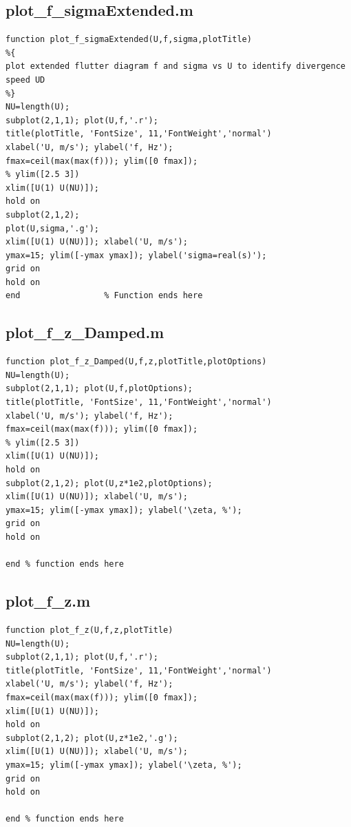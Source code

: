 \documentclass{article}
\begin{document}
\newpage
\subsection{plot\_f\_sigmaExtended.m}
\begin{lstlisting}[caption={Helper script for Homework 1.}, label={lst:main_script}]
function plot_f_sigmaExtended(U,f,sigma,plotTitle)
%{
plot extended flutter diagram f and sigma vs U to identify divergence speed UD
%}
NU=length(U);
subplot(2,1,1); plot(U,f,'.r');
title(plotTitle, 'FontSize', 11,'FontWeight','normal')
xlabel('U, m/s'); ylabel('f, Hz');
fmax=ceil(max(max(f))); ylim([0 fmax]);
% ylim([2.5 3])
xlim([U(1) U(NU)]);
hold on
subplot(2,1,2);
plot(U,sigma,'.g');
xlim([U(1) U(NU)]); xlabel('U, m/s');
ymax=15; ylim([-ymax ymax]); ylabel('sigma=real(s)');
grid on
hold on
end                 % Function ends here
\end{lstlisting}

\newpage
\subsection{plot\_f\_z\_Damped.m}
\begin{lstlisting}[caption={Helper script for Homework 1.}, label={lst:main_script}]
function plot_f_z_Damped(U,f,z,plotTitle,plotOptions)
NU=length(U); 
subplot(2,1,1); plot(U,f,plotOptions); 
title(plotTitle, 'FontSize', 11,'FontWeight','normal')
xlabel('U, m/s'); ylabel('f, Hz'); 
fmax=ceil(max(max(f))); ylim([0 fmax]);
% ylim([2.5 3])
xlim([U(1) U(NU)]);  
hold on
subplot(2,1,2); plot(U,z*1e2,plotOptions);
xlim([U(1) U(NU)]); xlabel('U, m/s'); 
ymax=15; ylim([-ymax ymax]); ylabel('\zeta, %'); 
grid on
hold on
 
end % function ends here
\end{lstlisting}

\newpage
\subsection{plot\_f\_z.m}
\begin{lstlisting}[caption={Helper script for Homework 1.}, label={lst:main_script}]
function plot_f_z(U,f,z,plotTitle)
NU=length(U);
subplot(2,1,1); plot(U,f,'.r');
title(plotTitle, 'FontSize', 11,'FontWeight','normal')
xlabel('U, m/s'); ylabel('f, Hz');
fmax=ceil(max(max(f))); ylim([0 fmax]);
xlim([U(1) U(NU)]);
hold on
subplot(2,1,2); plot(U,z*1e2,'.g');
xlim([U(1) U(NU)]); xlabel('U, m/s');
ymax=15; ylim([-ymax ymax]); ylabel('\zeta, %');
grid on
hold on

end % function ends here
\end{lstlisting}
\end{document}
